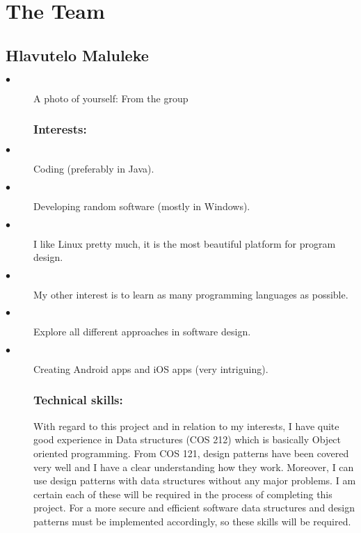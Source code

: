 \documentclass[12pt]{article}
\begin{document}


\newpage


\pagebreak

\section{The Team}


\subsection{Hlavutelo Maluleke}

\begin{description}
  \item[$\bullet$] A photo of yourself: From the group
  \subsubsection{Interests:}
  
  \item[$\bullet$] Coding (preferably in Java).
	 \item[$\bullet$] Developing random software (mostly in Windows).
	 \item[$\bullet$] I like Linux pretty much, it is the most beautiful platform for program design.
	 \item[$\bullet$] My other interest is to learn as many programming languages as possible.
	 \item[$\bullet$] Explore all different approaches in software design.
	 \item[$\bullet$] Creating Android apps and iOS apps (very intriguing).
	 
	 
	 \subsubsection{Technical skills:}
	 
	 With regard to this project and in relation to my interests, I have quite good experience in Data structures (COS 212) which is basically Object oriented programming. From COS 121, design patterns have been covered very well and I have a clear understanding how they work. Moreover, I can use design patterns with data structures without any major problems. I am certain each of these will be required in the process of completing this project. For a more secure and efficient software data structures and design patterns must be implemented accordingly, so these skills will be required.
	 

\end{description}
\end{document}

